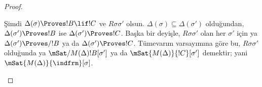 \begin{proof}
\begin{enumerate}
{      Şimdi $\Delta(\sigma)\Proves !B\lif !C$ ve $R\sigma\sigma'$ olsun.
      $\Delta(\sigma)\subseteq\Delta(\sigma')$ olduğundan,
      $\Delta(\sigma')\Proves !B$ ise $\Delta(\sigma')\Proves !C$.
      Başka bir deyişle, $R\sigma\sigma'$ olan her $\sigma'$ için ya
      $\Delta(\sigma')\Proves/ !B$ ya da $\Delta(\sigma')\Proves !C$.
      Tümevarım varsayımına göre bu, $R\sigma\sigma'$ olduğunda ya
      $\mSat/{M(\Delta)}{!B}[\sigma']$ ya da
      $\mSat{M(\Delta)}{!C}[\sigma']$ demektir; yani
      $\mSat{M(\Delta)}{\indfrm}[\sigma]$.}
  \end{enumerate}
\end{proof}

